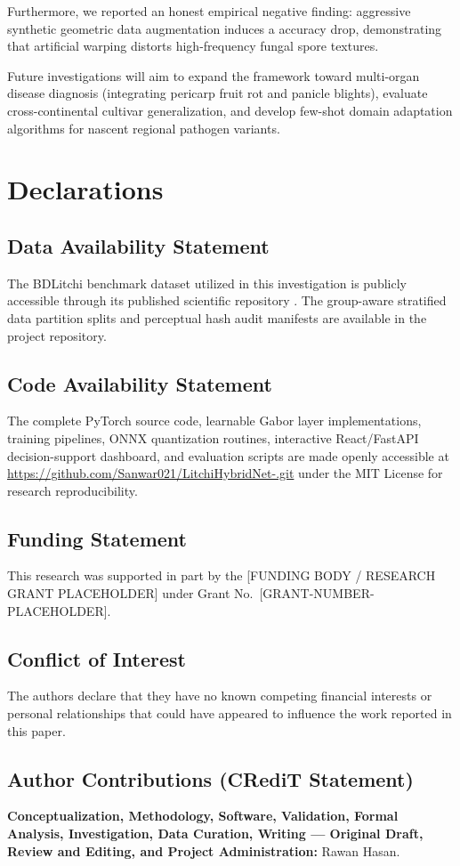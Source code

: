 Furthermore, we reported an honest empirical negative finding: aggressive synthetic geometric data augmentation induces a \deltaAcc{} accuracy drop, demonstrating that artificial warping distorts high-frequency fungal spore textures.

Future investigations will aim to expand the framework toward multi-organ disease diagnosis (integrating pericarp fruit rot and panicle blights), evaluate cross-continental cultivar generalization, and develop few-shot domain adaptation algorithms for nascent regional pathogen variants.

\section*{Declarations}
\subsection*{Data Availability Statement}
The BDLitchi benchmark dataset utilized in this investigation is publicly accessible through its published scientific repository \cite{litchi_dataset_2022}. The group-aware stratified data partition splits and perceptual hash audit manifests are available in the project repository.

\subsection*{Code Availability Statement}
The complete PyTorch source code, learnable Gabor layer implementations, training pipelines, ONNX quantization routines, interactive React/FastAPI decision-support dashboard, and evaluation scripts are made openly accessible at \url{https://github.com/Sanwar021/LitchiHybridNet-.git} under the MIT License for research reproducibility.

\subsection*{Funding Statement}
This research was supported in part by the [FUNDING BODY / RESEARCH GRANT PLACEHOLDER] under Grant No.~[GRANT-NUMBER-PLACEHOLDER].

\subsection*{Conflict of Interest}
The authors declare that they have no known competing financial interests or personal relationships that could have appeared to influence the work reported in this paper.

\subsection*{Author Contributions (CRediT Statement)}
\textbf{Conceptualization, Methodology, Software, Validation, Formal Analysis, Investigation, Data Curation, Writing --- Original Draft, Review and Editing, and Project Administration:} Rawan Hasan.

